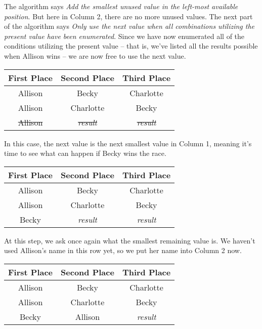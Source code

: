 The algorithm says \textit{Add the smallest unused value in the left-most available position}.  But here in Column 2, there are no more unused values.  The next part of the algorithm says  \textit{Only use the next value when all combinations utilizing the present value have been enumerated}.  Since we have now enumerated all of the conditions utilizing the present value -- that is, we've listed all the results possible when Allison wins -- we are now free to use the next value.

\begin{center}
    \begin{tabulary}{\textwidth}{CCC}
        First Place & Second Place & Third Place\\
        \hline
        Allison & Becky & Charlotte\\
        Allison & Charlotte & Becky\\
        \sout{Allison} & \sout{\textit{result}} & \sout{\textit{result}}
    \end{tabulary}
\end{center}

In this case, the next value is the next smallest value in Column 1, meaning it's time to see what can happen if Becky wins the race.

\begin{center}
    \begin{tabulary}{\textwidth}{CCC}
        First Place & Second Place & Third Place\\
        \hline
        Allison & Becky & Charlotte\\
        Allison & Charlotte & Becky\\
        Becky & \textit{result} & \textit{result}
    \end{tabulary}
\end{center}

At this step, we ask once again what the smallest remaining value is.  We haven't used Allison's name in this row yet, so we put her name into Column 2 now.

\begin{center}
    \begin{tabulary}{\textwidth}{CCC}
        First Place & Second Place & Third Place\\
        \hline
        Allison & Becky & Charlotte\\
        Allison & Charlotte & Becky\\
        Becky & Allison & \textit{result}
    \end{tabulary}
\end{center}

